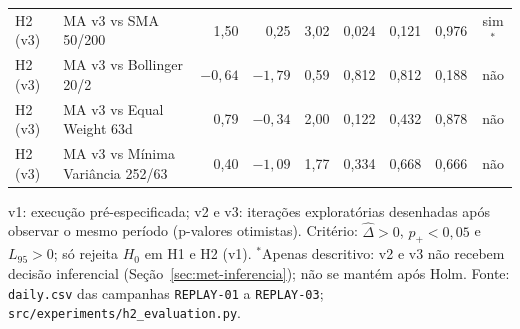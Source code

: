 \begin{table}[htbp]
{\begin{tabular}{llrrrrrrc}
H2 (v3) & MA v3 vs SMA 50/200 & 1{,}50 & 0{,}25 & 3{,}02 & 0{,}024 & 0{,}121 & 0{,}976 & sim$^{*}$ \\
H2 (v3) & MA v3 vs Bollinger 20/2 & $-0{,}64$ & $-1{,}79$ & 0{,}59 & 0{,}812 & 0{,}812 & 0{,}188 & não \\
H2 (v3) & MA v3 vs Equal Weight 63d & 0{,}79 & $-0{,}34$ & 2{,}00 & 0{,}122 & 0{,}432 & 0{,}878 & não \\
H2 (v3) & MA v3 vs Mínima Variância 252/63 & 0{,}40 & $-1{,}09$ & 1{,}77 & 0{,}334 & 0{,}668 & 0{,}666 & não \\
\bottomrule
\end{tabular}}
\par\smallskip\footnotesize v1: execução pré-especificada; v2 e v3: iterações exploratórias desenhadas após observar o mesmo período (p-valores otimistas). Critério: $\hat{\Delta} > 0$, $p_+ < 0{,}05$ e $L_{95} > 0$; só rejeita $H_0$ em H1 e H2 (v1). $^{*}$Apenas descritivo: v2 e v3 não recebem decisão inferencial (Seção~\ref{sec:met-inferencia}); não se mantém após Holm. Fonte: \texttt{daily.csv} das campanhas \texttt{REPLAY-01} a \texttt{REPLAY-03}; \texttt{src/experiments/h2\_evaluation.py}.
\end{table}
